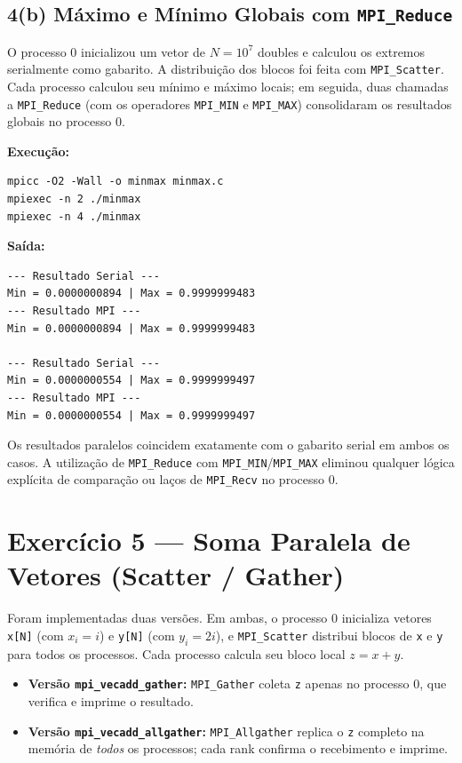 \documentclass[12pt,a4paper]{article}
\begin{document}
\subsection{4(b) Máximo e Mínimo Globais com \texttt{MPI\_Reduce}}

O processo 0 inicializou um vetor de $N = 10^7$ doubles e calculou os extremos serialmente como gabarito. A distribuição dos blocos foi feita com \texttt{MPI\_Scatter}. Cada processo calculou seu mínimo e máximo locais; em seguida, duas chamadas a \texttt{MPI\_Reduce} (com os operadores \texttt{MPI\_MIN} e \texttt{MPI\_MAX}) consolidaram os resultados globais no processo 0.

\textbf{Execução:}
\begin{lstlisting}[style=shell]
mpicc -O2 -Wall -o minmax minmax.c
mpiexec -n 2 ./minmax
mpiexec -n 4 ./minmax
\end{lstlisting}

\textbf{Saída:}
\begin{lstlisting}[style=shell]
--- Resultado Serial ---
Min = 0.0000000894 | Max = 0.9999999483
--- Resultado MPI ---
Min = 0.0000000894 | Max = 0.9999999483

--- Resultado Serial ---
Min = 0.0000000554 | Max = 0.9999999497
--- Resultado MPI ---
Min = 0.0000000554 | Max = 0.9999999497
\end{lstlisting}

Os resultados paralelos coincidem exatamente com o gabarito serial em ambos os casos. A utilização de \texttt{MPI\_Reduce} com \texttt{MPI\_MIN}/\texttt{MPI\_MAX} eliminou qualquer lógica explícita de comparação ou laços de \texttt{MPI\_Recv} no processo 0.

\section{Exercício 5 — Soma Paralela de Vetores (Scatter / Gather)}

Foram implementadas duas versões. Em ambas, o processo 0 inicializa vetores \texttt{x[N]} (com $x_i = i$) e \texttt{y[N]} (com $y_i = 2i$), e \texttt{MPI\_Scatter} distribui blocos de \texttt{x} e \texttt{y} para todos os processos. Cada processo calcula seu bloco local $z = x + y$.

\begin{itemize}
  \item \textbf{Versão \texttt{mpi\_vecadd\_gather}:} \texttt{MPI\_Gather} coleta \texttt{z} apenas no processo 0, que verifica e imprime o resultado.
  \item \textbf{Versão \texttt{mpi\_vecadd\_allgather}:} \texttt{MPI\_Allgather} replica o \texttt{z} completo na memória de \emph{todos} os processos; cada rank confirma o recebimento e imprime.
\end{itemize}
\end{document}
